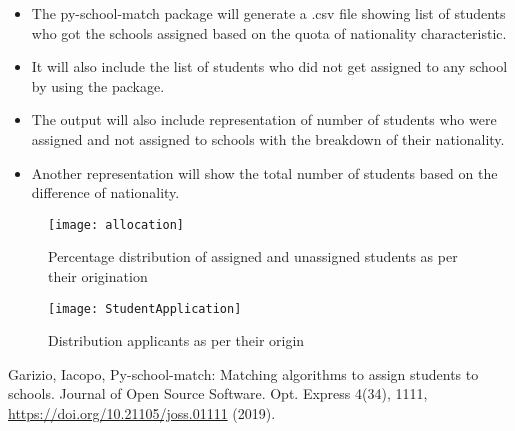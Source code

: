 \documentclass[twocolumn]{article}
\begin{document}
\begin{itemize}
    \vspace{-0.4cm}\item The py-school-match package will generate a .csv file showing list of students who got the schools assigned based on the quota of nationality characteristic.\\
    \vspace{-0.4cm}\item It will also include the list of students who did not get assigned to any school by using the package.\\
    \vspace{-0.4cm}\item The output will also include representation of number of students who were assigned and not assigned to schools with the breakdown of their nationality.\\
    \vspace{-0.4cm}\item Another representation will show the total number of students based on the difference of nationality.\\
\end{itemize}
\begin{figure}[h!]
  \centering
  \texttt{[image: allocation]}
    \caption{Percentage distribution of assigned and unassigned students as per their origination}
    \label{fig:Assigned}
\end{figure}

\begin{figure}[h!]
  \centering
  \texttt{[image: StudentApplication]}
    \caption{Distribution applicants as per their origin}
    \label{fig:Distribution}
\end{figure}
\begin{thebibliography}{1}

Garizio, Iacopo, 
  {Py-school-match: Matching algorithms to assign students to schools. Journal of Open Source Software.} Opt. Express {4(34)},
  1111, \url{https://doi.org/10.21105/joss.01111} (2019).
\end{thebibliography}
\end{document}
